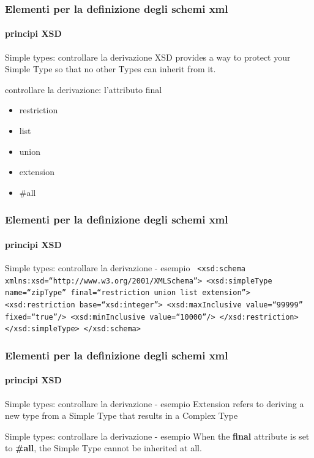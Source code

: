 \begin{frame}
	\frametitle{Elementi per la definizione degli schemi xml}
	\framesubtitle{principi XSD}
	\addtocounter{nframe}{1}

	\begin{block}{Simple types: controllare la derivazione}
		XSD provides a way to protect your Simple Type so that no other Types can inherit from it.
		
	\end{block}

	\begin{block}{controllare la derivazione: l'attributo final}
		\begin{itemize}
			\item restriction
			\item list
			\item union
			\item extension
			\item \#all
		\end{itemize}
	\end{block}

\end{frame}


\begin{frame}
	\frametitle{Elementi per la definizione degli schemi xml}
	\framesubtitle{principi XSD}
	\addtocounter{nframe}{1}

	\begin{block}{Simple types: controllare la derivazione - esempio}
		\texttt{
			<xsd:schema xmlns:xsd=``http://www.w3.org/2001/XMLSchema''>
			<xsd:simpleType name=``zipType''
			final=``restriction union list extension''>
			<xsd:restriction base=``xsd:integer''>
			<xsd:maxInclusive value=``99999'' fixed=``true''/>
			<xsd:minInclusive value=``10000''/>
			</xsd:restriction>
			</xsd:simpleType>
			</xsd:schema>
		}
	\end{block}

\end{frame}

\begin{frame}
	\frametitle{Elementi per la definizione degli schemi xml}
	\framesubtitle{principi XSD}
	\addtocounter{nframe}{1}

	\begin{block}{Simple types: controllare la derivazione - esempio}
		Extension refers to deriving a new type from a Simple Type that results in a Complex Type
	\end{block}

	\begin{block}{Simple types: controllare la derivazione - esempio}
		When the \textbf{final} attribute is set to \textbf{\#all}, the Simple Type cannot be inherited at all.
	\end{block}

\end{frame}


